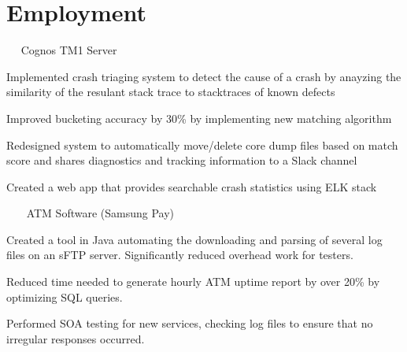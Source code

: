 \documentclass[]{deedy-resume-openfont}
\begin{document}
\hfill
\begin{minipage}[t]{0.66\textwidth} 


\section{Employment}

~~ Cognos TM1 Server
\vspace{\topsep} %
\begin{tightemize}
\item Implemented crash triaging system to detect the cause of a crash by anayzing the similarity of the resulant stack trace to stacktraces of known defects
\item Improved bucketing accuracy by 30\% by implementing new matching algorithm
\item Redesigned system to automatically move/delete core dump files based on match score and shares diagnostics and tracking information to a Slack channel
\item Created a web app that provides searchable crash statistics using ELK stack
\end{tightemize}
\sectionsep

~~~ ATM Software (Samsung Pay) 
\begin{tightemize}
\item Created a tool in Java automating the downloading and parsing of several log files on an sFTP server. Significantly reduced overhead work for testers. %
\item Reduced time needed to generate hourly ATM uptime report by over 20\% by optimizing SQL queries.   
\item Performed SOA testing for new services, checking log files to ensure that no irregular responses occurred.
\end{tightemize}
\sectionsep


\end{minipage}
\end{document}

